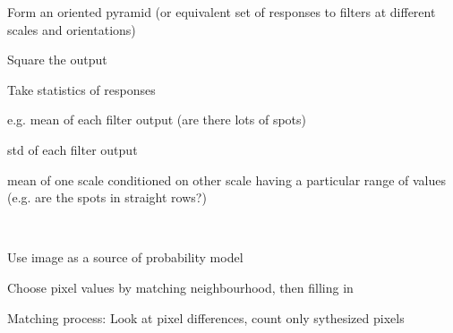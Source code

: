 \begin{compactdesc}
\begin{enumerate*}[label=\protect\circled{\arabic*},itemjoin=]
			\item Form an oriented pyramid (or equivalent set of responses to filters at different scales and orientations)\\
			\item Square the output\\
			\item Take statistics of responses\\
				\begin{enumerate*}[label=\quad\protect\circled{\alph*},itemjoin=]
					\item e.g. mean of each filter output (are there lots of spots)\\
					\item std of each filter output\\
					\item mean of one scale conditioned on other scale having a particular range of values (e.g. are the spots in straight rows?)
				\end{enumerate*}
		\end{enumerate*}
	\item[\lp{Texture synthesis}] \hfill\\
		\begin{enumerate*}[label=\protect\circled{\arabic*},itemjoin=]
			\item Use image as a source of probability model\\
			\item Choose pixel values by matching neighbourhood, then filling in\\
			\item Matching process: Look at pixel differences, count only sythesized pixels
		\end{enumerate*}

\end{compactdesc}
